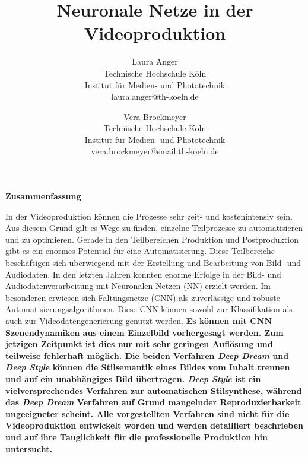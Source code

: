 \documentclass[times, 11pt,twocolumn]{article}
\begin{document}
\title{Neuronale Netze in der Videoproduktion}

\author{Laura Anger\\
Technische Hochschule K\"oln \\ Institut f\"ur Medien- und Phototechnik \\  laura.anger@th-koeln.de \\
\and
Vera Brockmeyer\\
Technische Hochschule K\"oln \\ Institut f\"ur Medien- und Phototechnik \\ vera.brockmeyer@smail.th-koeln.de \\
}

\maketitle
\thispagestyle{empty}


\large{\textbf{Zusammenfassung}}\\ \small %

In der Videoproduktion können die Prozesse sehr zeit- und kostenintensiv sein. Aus diesem Grund gilt es Wege zu finden, einzelne Teilprozesse zu automatisieren und zu optimieren. Gerade in den Teilbereichen Produktion und Postproduktion gibt es ein enormes Potential für eine Automatisierung. Diese Teilbereiche beschäftigen sich überwiegend mit der Erstellung und Bearbeitung von Bild- und Audiodaten. In den letzten Jahren konnten enorme Erfolge in der Bild- und Audiodatenverarbeitung mit Neuronalen Netzen (NN) erzielt werden. Im besonderen erwiesen sich Faltungsnetze (CNN) als zuverlässige und robuste Automatisierungsalgorithmen. Diese CNN können sowohl zur Klassifikation als auch zur Videodatengenerierung genutzt werden.
\textbf{Es können mit CNN Szenendynamiken aus einem Einzelbild vorhergesagt werden. Zum jetzigen Zeitpunkt ist dies nur mit sehr geringen Auflösung und teilweise fehlerhaft möglich. Die beiden Verfahren \textit{Deep Dream} und \textit{Deep Style} können die Stilsemantik eines Bildes vom Inhalt trennen und auf ein unabhängiges Bild übertragen. \textit{Deep Style} ist ein vielversprechendes Verfahren zur automatischen Stilsynthese, während das \textit{Deep Dream} Verfahren auf Grund mangelnder Reproduzierbarkeit ungeeigneter scheint. Alle vorgestellten Verfahren sind nicht für die Videoproduktion entwickelt worden und werden detailliert beschrieben und auf ihre Tauglichkeit für die professionelle Produktion hin untersucht. }\\
\end{document}
